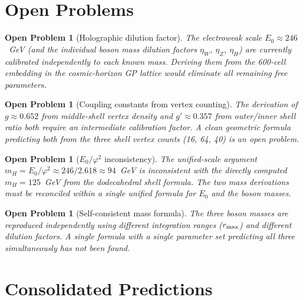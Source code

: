\documentclass[11pt,letterpaper]{article}
\newtheorem{openprob}[theorem]{Open Problem}
\newcommand{\phig}{\varphi}
\begin{document}
\section{Open Problems}

\begin{openprob}[Holographic dilution factor]
\label{op:dilution}
The electroweak scale $E_0 \approx 246$~GeV (and the individual boson
mass dilution factors $\eta_W$, $\eta_Z$, $\eta_H$) are currently
calibrated independently to each known mass.  Deriving them from the
600-cell embedding in the cosmic-horizon GP lattice would eliminate all
remaining free parameters.
\end{openprob}

\begin{openprob}[Coupling constants from vertex counting]
\label{op:coupling}
The derivation of $g \approx 0.652$ from middle-shell vertex density
and $g' \approx 0.357$ from outer/inner shell ratio both require an
intermediate calibration factor.  A clean geometric formula predicting
both from the three shell vertex counts (16, 64, 40) is an open problem.
\end{openprob}

\begin{openprob}[$E_0/\phig^2$ inconsistency]
\label{op:e0}
The unified-scale argument $m_H = E_0/\phig^2
\approx 246/2.618 \approx 94$~GeV is inconsistent with the directly
computed $m_H = 125$~GeV from the dodecahedral shell formula.  The two
mass derivations must be reconciled within a single unified formula for
$E_0$ and the boson masses.
\end{openprob}

\begin{openprob}[Self-consistent mass formula]
\label{op:mass}
The three boson masses are reproduced independently using different
integration ranges ($r_{\rm max}$) and different dilution factors.
A single formula with a single parameter set predicting all three
simultaneously has not been found.
\end{openprob}

\section{Consolidated Predictions}
\end{document}
